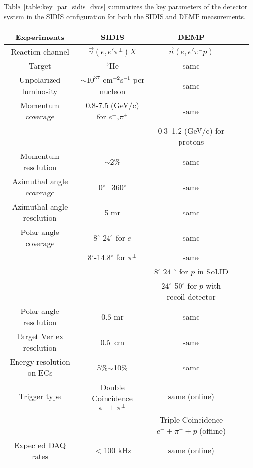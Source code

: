 Table~\ref{table:key_par_sidis_dvcs} summarizes the key parameters of the
detector system in the SIDIS configuration for both the SIDIS and DEMP
measurements.
\begin{table} \centering
\begin{tabular}{|c|c|c|c|c|}
\hline
Experiments                & SIDIS                    & DEMP  \\\hline
Reaction channel           & $\vec{n}(e,e'\pi^{\pm})X$ & $\vec{n}(e,e'\pi^{-}p)$	\\\hline
Target                     & $^3$He                   &same 	\\\hline
Unpolarized luminosity     & $\sim10^{37}$ cm$^{-2}$s$^{-1}$ per nucleon & same	\\\hline 
Momentum coverage          & 0.8-7.5 (GeV/c) for  $e^-$,$\pi^{\pm}$           &same 	\\
          										&   & 0.3~1.2 (GeV/c) for protons	\\\hline
Momentum resolution        & $\sim$2\%                & same\\\hline
Azimuthal angle coverage   & 0$^{\circ}$ ~360$^{\circ}$ & same	\\\hline
Azimuthal angle resolution & 5 mr                     & same	\\\hline
Polar angle coverage       & 8$^{\circ}$-24$^{\circ}$ for $e$ &  same \\
       & 8$^{\circ}$-14.8$^{\circ}$ for $\pi^{\pm}$  &  same 	\\
                           &                          & 8$^{\circ}$-24
                                                        $^{\circ}$ for $p$ in SoLID\\
                           &                          & 24$^{\circ}$-50$^{\circ}$ for $p$ with recoil detector         \\\hline
Polar angle resolution     & 0.6 mr                   & same	\\\hline
Target Vertex resolution   & 0.5~cm                   & same \\\hline
 Energy resolution on ECs  & 5\%$\sim$10\%            & same   \\\hline
Trigger type               & Double Coincidence $e^-+\pi^{\pm}$ & same (online)\\
              &  & Triple Coincidence $e^-+\pi^{-}+p$ (offline)\\\hline

Expected DAQ rates         &  $<$100 kHz              &  same (online)\\\hline


\end{tabular}
\end{table}
